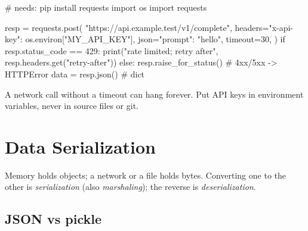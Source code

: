 \begin{pycode}
# needs: pip install requests
import os
import requests

resp = requests.post(
    "https://api.example.test/v1/complete",
    headers={"x-api-key": os.environ["MY_API_KEY"]},
    json={"prompt": "hello"},
    timeout=30,
)
if resp.status_code == 429:
    print("rate limited; retry after", resp.headers.get("retry-after"))
else:
    resp.raise_for_status()                    # 4xx/5xx -> HTTPError
    data = resp.json()                         # dict
\end{pycode}

\begin{gamerule}
A network call without a timeout can hang forever. Put API keys in environment variables,
never in source files or git.
\end{gamerule}

\section{Data Serialization}

Memory holds objects; a network or a file holds bytes. Converting one to the other is
\emph{serialization} (also \emph{marshaling}); the reverse is \emph{deserialization}.

\begin{center}
\end{center}

\subsection{JSON vs pickle}

